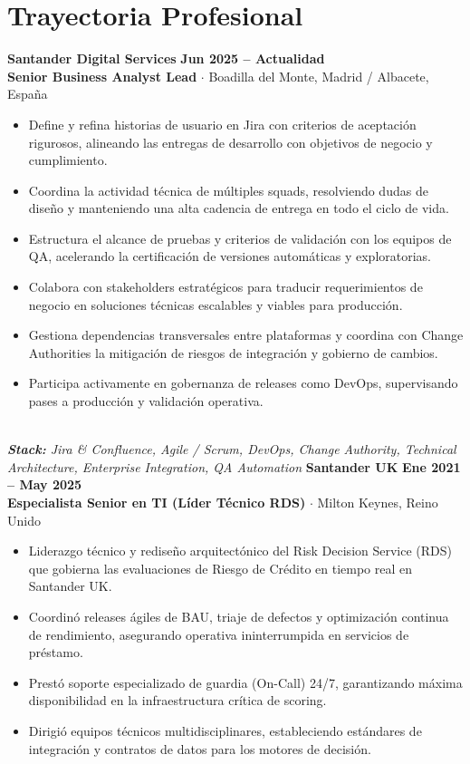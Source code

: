\documentclass[10pt,a4paper]{article}
\begin{document}
\section{Trayectoria Profesional}
\noindent\textbf{\large Santander Digital Services} \hfill {\color{SynthBlue}\textbf{Jun 2025 -- Actualidad}} \\
{\color{SynthPink}\textbf{Senior Business Analyst Lead}} $\cdot$ {\color{SlateGray}Boadilla del Monte, Madrid / Albacete, España}
\begin{itemize}[leftmargin=1.5em, itemsep=1.5pt, topsep=2pt]
    \item Define y refina historias de usuario en Jira con criterios de aceptación rigurosos, alineando las entregas de desarrollo con objetivos de negocio y cumplimiento.
    \item Coordina la actividad técnica de múltiples squads, resolviendo dudas de diseño y manteniendo una alta cadencia de entrega en todo el ciclo de vida.
    \item Estructura el alcance de pruebas y criterios de validación con los equipos de QA, acelerando la certificación de versiones automáticas y exploratorias.
    \item Colabora con stakeholders estratégicos para traducir requerimientos de negocio en soluciones técnicas escalables y viables para producción.
    \item Gestiona dependencias transversales entre plataformas y coordina con Change Authorities la mitigación de riesgos de integración y gobierno de cambios.
    \item Participa activamente en gobernanza de releases como DevOps, supervisando pases a producción y validación operativa.
\end{itemize}
\\\noindent\textit{\footnotesize \textbf{Stack:} Jira \& Confluence, Agile / Scrum, DevOps, Change Authority, Technical Architecture, Enterprise Integration, QA Automation}
\vspace{10pt}
\noindent\textbf{\large Santander UK} \hfill {\color{SynthBlue}\textbf{Ene 2021 -- May 2025}} \\
{\color{SynthPink}\textbf{Especialista Senior en TI (Líder Técnico RDS)}} $\cdot$ {\color{SlateGray}Milton Keynes, Reino Unido}
\begin{itemize}[leftmargin=1.5em, itemsep=1.5pt, topsep=2pt]
    \item Liderazgo técnico y rediseño arquitectónico del Risk Decision Service (RDS) que gobierna las evaluaciones de Riesgo de Crédito en tiempo real en Santander UK.
    \item Coordinó releases ágiles de BAU, triaje de defectos y optimización continua de rendimiento, asegurando operativa ininterrumpida en servicios de préstamo.
    \item Prestó soporte especializado de guardia (On-Call) 24/7, garantizando máxima disponibilidad en la infraestructura crítica de scoring.
    \item Dirigió equipos técnicos multidisciplinares, estableciendo estándares de integración y contratos de datos para los motores de decisión.
\end{itemize}
\end{document}
